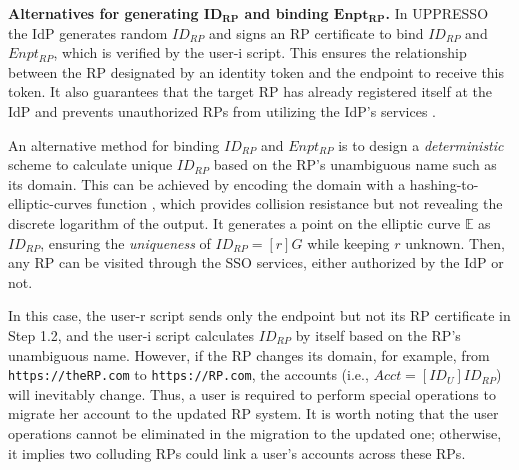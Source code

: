 %


\noindent \textbf{Alternatives for generating $\boldsymbol{ID_{RP}}$ and binding $\boldsymbol{Enpt_{RP}}$.}
In UPPRESSO the IdP generates random $ID_{RP}$ and signs an RP certificate to bind $ID_{RP}$ and $Enpt_{RP}$, which is verified by the user-i script.
This ensures the relationship between the RP designated by an identity token and the endpoint to receive this token.
It also guarantees that the target RP has already registered itself at the IdP and prevents unauthorized RPs from utilizing the IdP's services \cite{OpenIDConnect,save-flow}.

An alternative method for binding $ID_{RP}$ and $Enpt_{RP}$ is
 to design a \emph{deterministic} scheme to calculate unique $ID_{RP}$ based on the RP's unambiguous name such as its domain.
This can be achieved by encoding the domain with a hashing-to-elliptic-curves function \cite{irtf-cfrg-hash-to-curve-16}, which provides collision resistance but not revealing the discrete logarithm of the output. It generates a point on the elliptic curve $\mathbb{E}$ as $ID_{RP}$, ensuring the \emph{uniqueness} of $ID_{RP} = [r]G$ while keeping $r$ unknown. %
Then, any RP can be visited through the SSO services, either authorized by the IdP or not.

In this case, the user-r script sends only the endpoint but not its RP certificate in Step 1.2, and the user-i script calculates $ID_{RP}$ by itself based on the RP's unambiguous name. 
However, if the RP changes its domain, for example, from \verb+https://theRP.com+ to \verb+https://RP.com+, the accounts (i.e., $Acct = [ID_U]ID_{RP}$) will inevitably change.
Thus, a user is required to perform special operations to migrate her account to the updated RP system.
It is worth noting that the user operations cannot be eliminated in the migration to the updated one;
otherwise, it implies two colluding RPs could link a user's accounts across these RPs.


